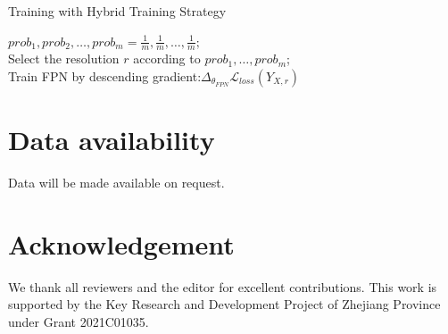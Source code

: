 \documentclass[a4paper,10pt]{article}
\begin{document}
\begin{multicols}{2}
\begin{algorithm}[H]
\label{alg:algo-1}
\SetAlgoCaptionSeparator{}
\caption{Training with Hybrid Training Strategy}
\SetAlgoNoLine
{}
$prob_1, prob_2, \ldots, prob_m = \frac{1}{m}, \frac{1}{m}, \ldots, \frac{1}{m};$\\
{
Select the resolution $r$ according to $prob_1,\ldots, prob_m$;\\Train FPN by descending gradient:$\Delta_{\theta_{FPN}}\mathcal{L}_{loss}\left(Y_{X, r}\right)$\\
}
\end{algorithm}

\section*{Data availability}
Data will be made available on request.

\section*{Acknowledgement}
We thank all reviewers and the editor for excellent contributions. This work is supported by the Key Research and Development Project of Zhejiang Province under Grant 2021C01035.

\printbibliography

\end{multicols}
\end{document}
